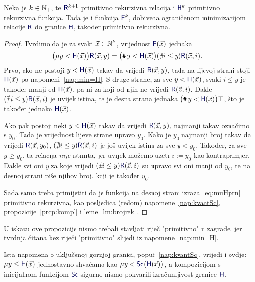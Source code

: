\begin{propozicija}[{name=[ograničena minimizacija čuva primitivnu rekurzivnost]}]\label{prop:muHprn}
Neka je $k\in{\mathbb N}_+$, te $\f R^{k+1}$\! primitivno rekurzivna relacija i $\f H^k$ primitivno rekurzivna funkcija. Tada je i funkcija $\f F^k$\!, dobivena ograničenom minimizacijom relacije $\f R$ do granice $\f H$, također primitivno rekurzivna.
\end{propozicija}
\begin{proof}
Tvrdimo da je za svaki $\vec x\in{\mathbb N}^k$, vrijednost $\f F(\vec x)$ jednaka
    \begin{equation}\label{eq:muHprn}
        \bigl(\mu y<\f H(\vec x)\bigr)\f R(\vec x,y)
        =
        \bigl(\num y<\f H(\vec x)\bigr)(\nexists i\le y)\f R(\vec x,i).
    \end{equation}
Prvo, ako ne postoji $y<\f H(\vec x)$ takav da vrijedi $\f R(\vec x,y)$, tada na lijevoj strani stoji $\f H(\vec x)$ po napomeni~\ref{nap:min=H}. S druge strane, za sve $y<\f H(\vec x)$, svaki $i\le y$ je također manji od $\f H(\vec x)$, pa ni za koji od njih ne vrijedi $\f R(\vec x,i)$. Dakle $(\nexists i\le y)\f R(\vec x,i)$ je uvijek istina, te je desna strana jednaka $\bigl(\num y<\f H(\vec x)\bigr)\top$, što je također jednako $\f H(\vec x)$.
    
Ako pak postoji neki $y<\f H(\vec x)$ takav da vrijedi $\f R(\vec x,y)$, najmanji takav označimo s $y_0$. Tada je vrijednost lijeve strane upravo $y_0$. Kako je $y_0$ najmanji broj takav da vrijedi $\f R(\vec x,y_0)$, $(\nexists i\le y)\f R(\vec x,i)$ je još uvijek istina za sve $y<y_0$. Također, za sve $y\ge y_0$, ta relacija \emph{nije} istinita, jer uvijek možemo uzeti $i:=y_0$ kao kontraprimjer. Dakle svi oni $y$ za koje vrijedi $(\nexists i\le y)\f R(\vec x,i)$ su upravo svi oni manji od $y_0$, te na desnoj strani piše njihov broj, koji je također $y_0$.
 
Sada samo treba primijetiti da je funkcija na desnoj strani izraza~\eqref{eq:muHprn} primitivno rekurzivna, kao posljedica (redom) napomene~\ref{nap:kvantSc}, propozicije~\ref{prop:kompl} i leme~\ref{lm:brojrek}.
\end{proof}
U iskazu ove propozicije nismo trebali stavljati riječ "primitivno" u zagrade, jer tvrdnja čitana bez riječi "primitivno" slijedi iz napomene~\ref{nap:min=H}.

\begin{napomena}[{name=[uključena gornja granica ograničene minimizacije]}]\label{nap:muSc}
Ista napomena o uključenoj gornjoj granici, poput~\ref{nap:kvantSc}, vrijedi i ovdje:
$\mu y\le\f H(\vec x)$ jednostavno shvaćamo kao $\mu y<\f{Sc}\bigl(\f H(\vec x)\bigr)$, a kompozicijom s inicijalnom funkcijom $\f{Sc}$ sigurno nismo pokvarili izračunljivost granice $\f H$.
\end{napomena}
